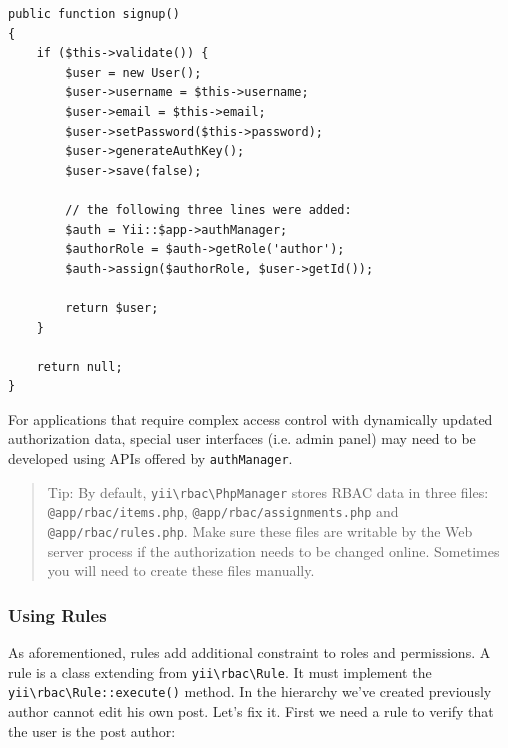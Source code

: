 \lstset{language=php}\begin{lstlisting}
public function signup()
{
    if ($this->validate()) {
        $user = new User();
        $user->username = $this->username;
        $user->email = $this->email;
        $user->setPassword($this->password);
        $user->generateAuthKey();
        $user->save(false);

        // the following three lines were added:
        $auth = Yii::$app->authManager;
        $authorRole = $auth->getRole('author');
        $auth->assign($authorRole, $user->getId());

        return $user;
    }

    return null;
}
\end{lstlisting}
For applications that require complex access control with dynamically updated authorization data, special user interfaces
(i.e. admin panel) may need to be developed using APIs offered by \lstinline|authManager|.

\begin{quote}Tip: By default, \texttt{yii{\allowbreak{}\textbackslash}rbac{\allowbreak{}\textbackslash}PhpManager} stores RBAC data in three files: \lstinline|@app/rbac/items.php|, \lstinline|@app/rbac/assignments.php| and \lstinline|@app/rbac/rules.php|.
  Make sure these files are writable by the Web server process if the authorization needs to be changed online.
  Sometimes you will need to create these files manually.

\end{quote}
\subsubsection{Using Rules}
As aforementioned, rules add additional constraint to roles and permissions. A rule is a class extending
from \texttt{yii{\allowbreak{}\textbackslash}rbac{\allowbreak{}\textbackslash}Rule}. It must implement the \texttt{yii{\allowbreak{}\textbackslash}rbac{\allowbreak{}\textbackslash}Rule\allowbreak{}::\allowbreak{}execute()} method. In the hierarchy we've
created previously author cannot edit his own post. Let's fix it. First we need a rule to verify that the user is the post author:

